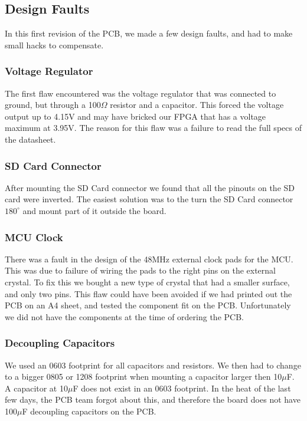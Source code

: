 \subsection{Design Faults}
In this first revision of the PCB, we made a few design faults, and had to make small hacks to compensate.

\subsubsection{Voltage Regulator}
The first flaw encountered was the voltage regulator that was connected to ground, but through a 100$\Omega$ resistor and a capacitor.
This forced the voltage output up to 4.15V and may have bricked our FPGA that has a voltage maximum at 3.95V.
The reason for this flaw was a failure to read the full specs of the datasheet.

\subsubsection{SD Card Connector}
After mounting the SD Card connector we found that all the pinouts on the SD card were inverted.
The easiest solution was to the turn the SD Card connector $180^{\circ}$ and mount part of it outside the board.

\subsubsection{MCU Clock}
There was a fault in the design of the 48MHz external clock pads for the MCU. This was due to failure of wiring the pads to the right pins on the external crystal.
To fix this we bought a new type of crystal that had a smaller surface, and only two pins.
This flaw could have been avoided if we had printed out the PCB on an A4 sheet, and tested the component fit on the PCB.
Unfortunately we did not have the components at the time of ordering the PCB.

\subsubsection{Decoupling Capacitors}
We used an 0603 footprint for all capacitors and resistors.
We then had to change to a bigger 0805 or 1208 footprint when mounting a capacitor larger then 10$\mu$F.
A capacitor at 10$\mu$F does not exist in an 0603 footprint.
In the heat of the last few days, the PCB team forgot about this, and therefore the board does not have 100$\mu$F decoupling capacitors on the PCB.

